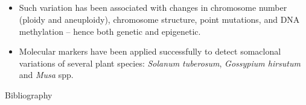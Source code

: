 \documentclass[
  ignorenonframetext,
  aspectratio=169]{beamer}
\newif\ifbibliography
\providecommand{\tightlist}{%
  \setlength{\itemsep}{0pt}\setlength{\parskip}{0pt}}
\begin{document}
\hypertarget{section-14}{%
\subsection{}\label{section-14}}

\begin{frame}{}
\begin{itemize}
\tightlist
\item
  Such variation has been associated with changes in chromosome number
  (ploidy and aneuploidy), chromosome structure, point mutations, and
  DNA methylation -- hence both genetic and epigenetic.
\item
  Molecular markers have been applied successfully to detect somaclonal
  variations of several plant species: \emph{Solanum tuberosum},
  \emph{Gossypium hirsutum} and \emph{Musa} spp.
\end{itemize}
\end{frame}

\renewcommand\refname{Bibliography}
\begin{frame}[allowframebreaks]{Bibliography}
  \bibliographytrue
  
\end{frame}
\end{document}
